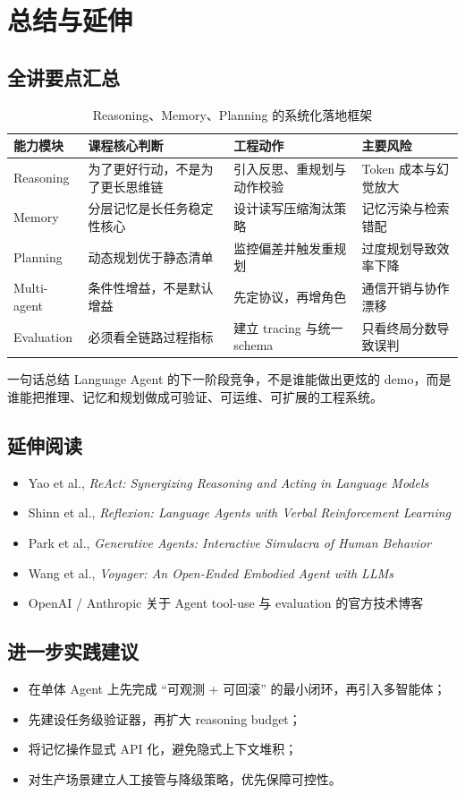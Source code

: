 \documentclass[a4paper]{article}
\begin{document}
\section{总结与延伸}

\subsection{全讲要点汇总}
\begin{table}[H]
\centering
\begin{tabular}{p{2.5cm}p{3.7cm}p{3.8cm}p{2.6cm}}
\toprule
\textbf{能力模块} & \textbf{课程核心判断} & \textbf{工程动作} & \textbf{主要风险} \\
\midrule
Reasoning & 为了更好行动，不是为了更长思维链 & 引入反思、重规划与动作校验 & Token 成本与幻觉放大 \\
Memory & 分层记忆是长任务稳定性核心 & 设计读写压缩淘汰策略 & 记忆污染与检索错配 \\
Planning & 动态规划优于静态清单 & 监控偏差并触发重规划 & 过度规划导致效率下降 \\
Multi-agent & 条件性增益，不是默认增益 & 先定协议，再增角色 & 通信开销与协作漂移 \\
Evaluation & 必须看全链路过程指标 & 建立 tracing 与统一 schema & 只看终局分数导致误判 \\
\bottomrule
\end{tabular}
\caption{Reasoning、Memory、Planning 的系统化落地框架}
\end{table}

\begin{importantbox}{一句话总结}
Language Agent 的下一阶段竞争，不是谁能做出更炫的 demo，而是谁能把推理、记忆和规划做成可验证、可运维、可扩展的工程系统。
\end{importantbox}

\subsection{延伸阅读}
\begin{itemize}
    \item Yao et al., \textit{ReAct: Synergizing Reasoning and Acting in Language Models}
    \item Shinn et al., \textit{Reflexion: Language Agents with Verbal Reinforcement Learning}
    \item Park et al., \textit{Generative Agents: Interactive Simulacra of Human Behavior}
    \item Wang et al., \textit{Voyager: An Open-Ended Embodied Agent with LLMs}
    \item OpenAI / Anthropic 关于 Agent tool-use 与 evaluation 的官方技术博客
\end{itemize}

\subsection{进一步实践建议}
\begin{itemize}
    \item 在单体 Agent 上先完成 ``可观测 + 可回滚'' 的最小闭环，再引入多智能体；
    \item 先建设任务级验证器，再扩大 reasoning budget；
    \item 将记忆操作显式 API 化，避免隐式上下文堆积；
    \item 对生产场景建立人工接管与降级策略，优先保障可控性。
\end{itemize}
\end{document}
